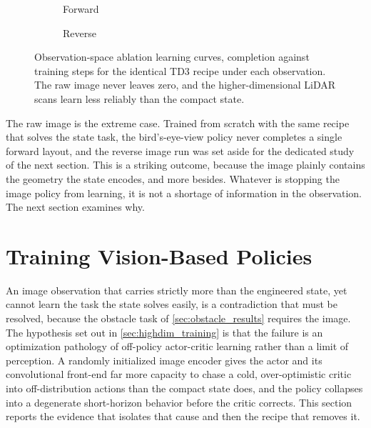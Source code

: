 \begin{figure}[H]
    \centering
    \begin{subfigure}{0.49\textwidth}
        \centering
        \caption{Forward}
        \label{fig:forward_obs_ablation}
    \end{subfigure}
    \hfill
    \begin{subfigure}{0.49\textwidth}
        \centering
        \caption{Reverse}
        \label{fig:reverse_obs_ablation}
    \end{subfigure}
    \caption{Observation-space ablation learning curves, completion against training steps for the identical TD3 recipe under each observation. The raw image never leaves zero, and the higher-dimensional LiDAR scans learn less reliably than the compact state.}
    \label{fig:obs_ablation}
\end{figure}

The raw image is the extreme case. Trained from scratch with the same recipe that solves the state task, the bird's-eye-view policy never completes a single forward layout, and the reverse image run was set aside for the dedicated study of the next section. This is a striking outcome, because the image plainly contains the geometry the state encodes, and more besides. Whatever is stopping the image policy from learning, it is not a shortage of information in the observation. The next section examines why.

\section{Training Vision-Based Policies}
\label{sec:vision}

An image observation that carries strictly more than the engineered state, yet cannot learn the task the state solves easily, is a contradiction that must be resolved, because the obstacle task of \cref{sec:obstacle_results} requires the image. The hypothesis set out in \cref{sec:highdim_training} is that the failure is an optimization pathology of off-policy actor-critic learning rather than a limit of perception. A randomly initialized image encoder gives the actor and its convolutional front-end far more capacity to chase a cold, over-optimistic critic into off-distribution actions than the compact state does, and the policy collapses into a degenerate short-horizon behavior before the critic corrects. This section reports the evidence that isolates that cause and then the recipe that removes it.

